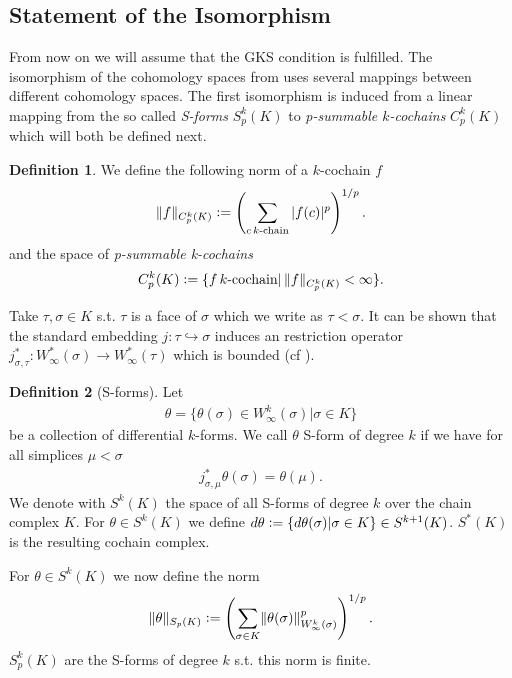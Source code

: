 \documentclass[12pt,a4paper]{article}
\theoremstyle{definition}
\newtheorem{definition}{Definition}
\newcommand{\norm}[1]{\lVert #1 \rVert}
\begin{document}
\subsection{Statement of the Isomorphism} \label{sec_isomorphism_cohomology}

From now on we will assume that the GKS condition is fulfilled.
The isomorphism of the cohomology spaces from \cite{goldshtein} uses several
mappings between different cohomology spaces. 
The first isomorphism is induced from a linear mapping
from the so called \textit{S-forms} 
$S_p^k(K)$ to \textit{p-summable $k$-cochains} $C_p^k(K)$ which will both 
be defined next.

\begin{definition}
    We define the following norm of a $k$-cochain $f$
    \begin{align*}
    \norm{f}_{C_p^k(K)} \vcentcolon= 
    \left( \sum\limits_{c \, k\text{-chain}} |f(c)|^p \right)^{1/p}.
    \end{align*}
    and the space of \textit{p-summable k-cochains}
    \begin{align*}
    C_p^k(K) \vcentcolon= \{f \, k\text{-cochain} | \,  
    \norm{f}_{C_p^k(K)} < \infty \}.
    \end{align*}
\end{definition}
Take $\tau, \sigma \in K$ s.t. $\tau$ is a face of $\sigma$ which we write as
$\tau < \sigma$. It can be shown that the standard embedding 
$j: \tau \hookrightarrow \sigma$ induces an
restriction operator 
$j^*_{\sigma, \tau}:W^*_\infty(\sigma) \rightarrow W^*_\infty(\tau) $ which is 
bounded (cf \cite[p.191]{goldshtein}). 
\begin{definition}[S-forms]
    Let 
    \begin{align*}
    \theta = \{ \theta(\sigma) \in W^k_\infty(\sigma) | \sigma \in K\}
    \end{align*}
    be a collection of differential $k$-forms. We call $\theta$ S-form of degree
    $k$ if we have for all simplices
    $\mu <\sigma$ 
    \begin{align*}
    j^*_{\sigma,\mu}\theta(\sigma) = \theta(\mu).
    \end{align*}
    We denote with $S^k(K)$ the space of all S-forms of degree $k$ over the chain
    complex $K$. 
    For $\theta \in S^k(K)$ we define $d\theta \vcentcolon= \{ d\theta(\sigma) | 
    \sigma \in K \} \in S^{k+1}(K)$. $S^*(K)$ is the resulting cochain complex.
\end{definition}
For $\theta \in S^k(K)$ we now define the norm
\begin{align*}
\lVert \theta \rVert _{S_p(K)}  \vcentcolon= \left( \sum_{\sigma \in K} 
\lVert \theta(\sigma) \rVert _{W^k_\infty(\sigma)}^p \right)^{1/p}.
\end{align*} 
$S^k_p(K)$ are the S-forms of degree $k$ s.t. this norm is finite.
\end{document}
